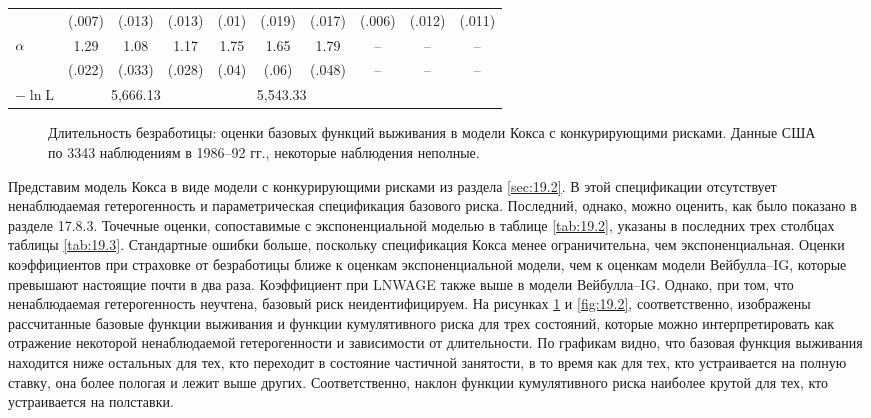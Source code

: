\begin{sidewaystable}[!htbp]
\begin{center}
\begin{tabular}{lccccccccc}
                    &(.007) &(.013) &(.013) &(.01)  &(.019) &(.017) &(.006) &(.012) &(.011) \\
$\alpha$               &1.29   &1.08   &1.17   &1.75   &1.65   &1.79   &--     &--     &-- \\
                    &(.022) &(.033) &(.028) &(.04)  &(.06)  &(.048) &--     &--     &-- \\
$-\ln\textrm{L}$    &\multicolumn{3}{c}{5,666.13}&\multicolumn{3}{c}{5,543.33} \\
\hline \hline
\end{tabular}
    \end{center}
\end{sidewaystable}

\begin{figure}[ht!]\caption{Длительность безработицы: оценки базовых функций выживания в модели Кокса с конкурирующими рисками. Данные США по 3343 наблюдениям в 1986--92 гг., некоторые наблюдения неполные.}\label{fig:19.1}
\centering
\end{figure}

Представим модель Кокса в виде модели с конкурирующими рисками из раздела \ref{sec:19.2}. В этой спецификации отсутствует ненаблюдаемая гетерогенность и параметрическая спецификация базового риска. Последний, однако, можно оценить, как было показано в разделе 17.8.3. %
Точечные оценки, сопоставимые с экспоненциальной моделью в таблице \ref{tab:19.2}, указаны в последних трех столбцах таблицы \ref{tab:19.3}. Стандартные ошибки больше, поскольку спецификация Кокса менее ограничительна, чем экспоненциальная. Оценки коэффициентов при страховке от безработицы ближе к оценкам экспоненциальной модели, чем к оценкам модели Вейбулла--IG, которые превышают настоящие почти в два раза. Коэффициент при LNWAGE также выше в модели Вейбулла--IG. Однако, при том, что ненаблюдаемая гетерогенность неучтена, базовый риск неидентифицируем. На рисунках \ref{fig:19.1} и \ref{fig:19.2}, соответственно, изображены рассчитанные базовые функции выживания и функции кумулятивного риска для трех состояний, которые можно интерпретировать как отражение некоторой ненаблюдаемой гетерогенности и зависимости от длительности. По графикам видно, что базовая функция выживания находится ниже остальных для тех, кто переходит в состояние частичной занятости, в то время как для тех, кто устраивается на полную ставку, она более пологая и лежит выше других. Соответственно, наклон функции кумулятивного риска наиболее крутой для тех, кто устраивается на полставки.

